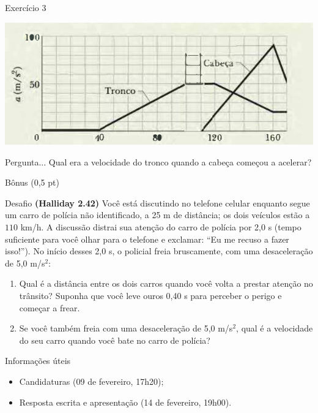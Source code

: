 \documentclass[xcolor=dvipsnames,table]{beamer}
\begin{document}
	\begin{frame}{Exercício 3}
			\begin{center}
				\includegraphics[scale=0.5]{images/fig2-13a}
			\end{center} \pause
		\begin{block}{Pergunta...}
			Qual era a velocidade do tronco quando a cabeça começou a acelerar?
		\end{block}
	\end{frame}
	
	\begin{frame}[shrink]{Bônus (0,5 pt)}
		\begin{block}{Desafio}
			{\bf (Halliday 2.42)} Você está discutindo no telefone celular enquanto segue um carro de polícia não identificado, a 25 m de distância; os dois veículos estão a $110$ km/h. A discussão distrai sua atenção do carro de polícia por 2,0 s (tempo suficiente para você olhar para o telefone e exclamar: ``Eu me recuso a fazer isso!''). No início desses 2,0 s, o	policial freia bruscamente, com uma desaceleração de 5,0 m/s$^2$:
			\begin{enumerate}
				\item Qual é a distância entre os dois carros quando você volta a prestar
				atenção no trânsito? Suponha que você leve ouros 0,40 s para perceber o perigo e começar a frear. 
				\item Se você também freia com uma
				desaceleração de 5,0 m/s$^2$, qual é a velocidade do seu carro quando
				você bate no carro de polícia?
			\end{enumerate}
		\end{block}
		\begin{block}{Informações úteis}
			\begin{itemize}
                \item Candidaturas (09 de fevereiro, 17h20);
                \item Resposta escrita e apresentação (14 de fevereiro, 19h00).
			\end{itemize}
		\end{block} 
	\end{frame}
	
	\begin{frame}
		\titlepage
	\end{frame}
	
\end{document}

